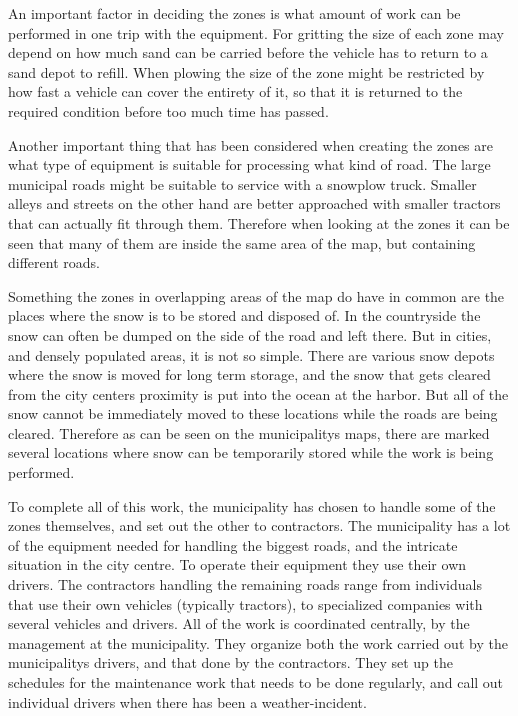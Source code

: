 An important factor in deciding the zones is what amount of work can be performed in one trip with the equipment. For gritting the size of each zone may depend on how much sand can be carried before the vehicle has to return to a sand depot to refill. When plowing the size of the zone might be restricted by how fast a vehicle can cover the entirety of it, so that it is returned to the required condition before too much time has passed.

Another important thing that has been considered when creating the zones are what type of equipment is suitable for processing what kind of road. The large municipal roads might be suitable to service with a snowplow truck. Smaller alleys and streets on the other hand are better approached with smaller tractors that can actually fit through them. Therefore when looking at the zones it can be seen that many of them are inside the same area of the map, but containing different roads.

Something the zones in overlapping areas of the map do have in common are the places where the snow is to be stored and disposed of. In the countryside the snow can often be dumped on the side of the road and left there. But in cities, and densely populated areas, it is not so simple. There are various snow depots where the snow is moved for long term storage, and the snow that gets cleared from the city centers proximity is put into the ocean at the harbor. But all of the snow cannot be immediately moved to these locations while the roads are being cleared. Therefore as can be seen on the municipalitys maps, there are marked several locations where snow can be temporarily stored while the work is being performed.

To complete all of this work, the municipality has chosen to handle some of the zones themselves, and set out the other to contractors. The municipality has a lot of the equipment needed for handling the biggest roads, and the intricate situation in the city centre. To operate their equipment they use their own drivers. The contractors handling the remaining roads range from individuals that use their own vehicles (typically tractors), to specialized companies with several vehicles and drivers. All of the work is coordinated centrally, by the management at the municipality. They organize both the work carried out by the municipalitys drivers, and that done by the contractors. They set up the schedules for the maintenance work that needs to be done regularly, and call out individual drivers when there has been a weather-incident.

